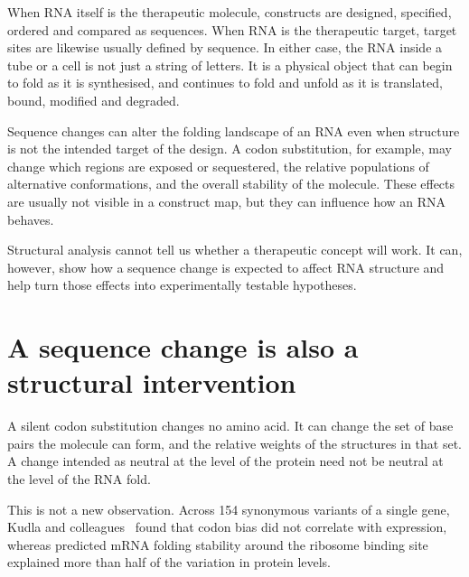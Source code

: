 %
%
%

\begin{lead}
	When RNA itself is the therapeutic molecule, constructs are designed, specified, ordered and compared as sequences. When RNA is the therapeutic target, target sites are likewise usually defined by sequence. In either case, the RNA inside a tube or a cell is not just a string of letters. It is a physical object that can begin to fold as it is synthesised, and continues to fold and unfold as it is translated, bound, modified and degraded.
\end{lead}

Sequence changes can alter the folding landscape of an RNA even when structure
is not the intended target of the design. A codon substitution, for example,
may change which regions are exposed or sequestered, the relative populations
of alternative conformations, and the overall stability of the molecule.
These effects are usually not visible in a construct map, but they can
influence how an RNA behaves.

Structural analysis cannot tell us whether a therapeutic concept will work.
It can, however, show how a sequence change is expected to affect RNA
structure and help turn those effects into experimentally testable hypotheses.

\section{A sequence change is also a structural intervention}

A silent codon substitution changes no amino acid. It can change the set of
base pairs the molecule can form, and the relative weights of the structures in
that set. A change intended as neutral at the level of the protein need not be
neutral at the level of the RNA fold.

This is not a new observation. Across 154 synonymous variants of a single gene,
Kudla and colleagues~\cite{kudla2009} found that codon bias did not correlate
with expression, whereas predicted mRNA folding stability around the ribosome
binding site explained more than half of the variation in protein levels.


